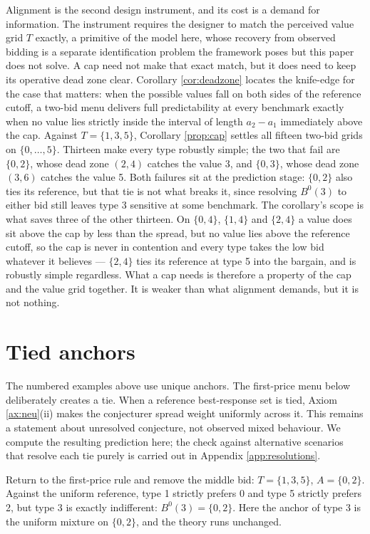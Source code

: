 \documentclass[12pt]{article}
\theoremstyle{definition}
\begin{document}
Alignment is the second design instrument, and its cost is a demand for information. The instrument requires the designer to match the perceived value grid $T$ exactly, a primitive of the model here, whose recovery from observed bidding is a separate identification problem the framework poses but this paper does not solve. A cap need not make that exact match, but it does need to keep its operative dead zone clear. Corollary \ref{cor:deadzone} locates the knife-edge for the case that matters: when the possible values fall on both sides of the reference cutoff, a two-bid menu delivers full predictability at every benchmark exactly when no value lies strictly inside the interval of length $a_2 - a_1$ immediately above the cap. Against $T = \{1,3,5\}$, Corollary \ref{prop:cap} settles all fifteen two-bid grids on $\{0,\dots,5\}$. Thirteen make every type robustly simple; the two that fail are $\{0,2\}$, whose dead zone $(2,4)$ catches the value 3, and $\{0,3\}$, whose dead zone $(3,6)$ catches the value 5. Both failures sit at the prediction stage: $\{0,2\}$ also ties its reference, but that tie is not what breaks it, since resolving $B^0(3)$ to either bid still leaves type 3 sensitive at some benchmark. The corollary's scope is what saves three of the other thirteen. On $\{0,4\}$, $\{1,4\}$ and $\{2,4\}$ a value does sit above the cap by less than the spread, but no value lies above the reference cutoff, so the cap is never in contention and every type takes the low bid whatever it believes --- $\{2,4\}$ ties its reference at type 5 into the bargain, and is robustly simple regardless. What a cap needs is therefore a property of the cap and the value grid together. It is weaker than what alignment demands, but it is not nothing.

\section{Tied anchors}\label{sec:ties}

The numbered examples above use unique anchors. The first-price menu below deliberately creates a tie. When a reference best-response set is tied, Axiom \ref{ax:neu}(ii) makes the conjecturer spread weight uniformly across it. This remains a statement about unresolved conjecture, not observed mixed behaviour. We compute the resulting prediction here; the check against alternative scenarios that resolve each tie purely is carried out in Appendix \ref{app:resolutions}.



Return to the first-price rule and remove the middle bid: $T = \{1, 3, 5\}$, $A = \{0, 2\}$. Against the uniform reference, type 1 strictly prefers 0 and type 5 strictly prefers 2, but type 3 is exactly indifferent: $B^0(3) = \{0, 2\}$. Here the anchor of type 3 is the uniform mixture on $\{0, 2\}$, and the theory runs unchanged.
\end{document}

